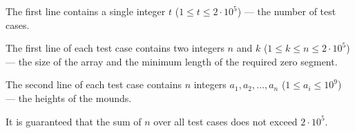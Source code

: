 The first line contains a single integer $t$ ($1 \le t \le 2 \cdot 10^5$) --- the number of test cases.

The first line of each test case contains two integers $n$ and $k$ ($1 \le k \le n \le 2 \cdot 10^5$) --- the size of the array and the minimum length of the required zero segment.

The second line of each test case contains $n$ integers $a_1, a_2, \ldots, a_n$ ($1 \le a_i \le 10^9$) --- the heights of the mounds.

It is guaranteed that the sum of $n$ over all test cases does not exceed $2 \cdot 10^5$.

